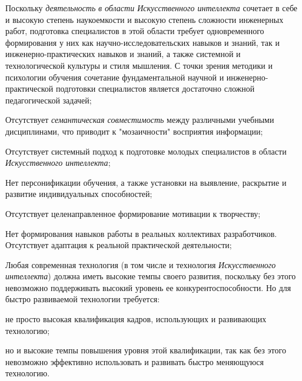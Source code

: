 \begin{textitemize}
	\item
	Поскольку \textit{деятельность} \textit{в области Искусственного интеллекта} сочетает в себе и высокую степень наукоемкости и высокую степень сложности инженерных работ, подготовка специалистов в этой области требует одновременного формирования у них как научно-исследовательских навыков и знаний, так и инженерно-практических навыков и знаний, а также системной и технологической культуры и стиля мышления. С точки зрения методики и психологии обучения сочетание фундаментальной научной и инженерно-практической подготовки специалистов является достаточно сложной педагогической задачей;
	\item
	Отсутствует \textit{семантическая совместимость} между различными учебными дисциплинами, что приводит к "мозаичности"{} восприятия информации;
	\item
	Отсутствует системный подход к подготовке молодых специалистов в области \textit{Искусственного интеллекта};
	\item
	Нет персонификации обучения, а также установки на выявление, раскрытие и развитие индивидуальных способностей;
	\item
	Отсутствует целенаправленное формирование мотивации к творчеству;
	\item
	Нет формирования навыков работы в реальных коллективах разработчиков. Отсутствует адаптация к реальной практической деятельности;
	\item
	Любая современная технология (в том числе и технология \textit{Искусственного интеллекта}) должна иметь высокие темпы своего развития, поскольку без этого невозможно поддерживать высокий уровень ее конкурентоспособности. Но для быстро развиваемой технологии требуется:
	\begin{textitemize}
		\item
		не просто высокая квалификация кадров, использующих и развивающих технологию;
		\item
		но и высокие темпы повышения уровня этой квалификации, так как без этого невозможно эффективно использовать и развивать быстро меняющуюся технологию.
	\end{textitemize}
\end{textitemize}

